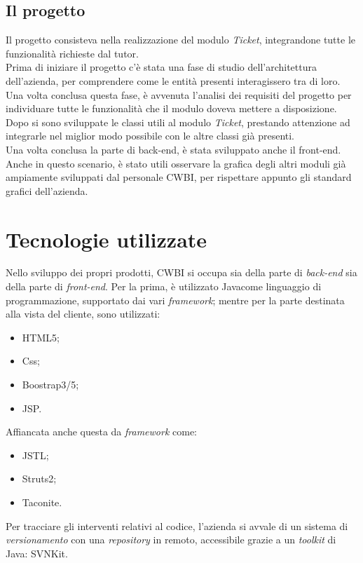 \subsection{Il progetto}
Il progetto consisteva nella realizzazione del modulo \textit{Ticket}, integrandone tutte le funzionalità richieste dal tutor. \\
Prima di iniziare il progetto c'è stata una fase di studio dell'architettura dell'azienda, per comprendere come le entità presenti interagissero tra di loro. Una volta conclusa questa fase, è avvenuta l'analisi dei requisiti del progetto per individuare tutte le funzionalità che il modulo doveva mettere a disposizione. Dopo si sono sviluppate le classi utili al modulo \textit{Ticket}, prestando attenzione ad integrarle nel miglior modo possibile con le altre classi già presenti. \\
Una volta conclusa la parte di back-end, è stata sviluppato anche il front-end. Anche in questo scenario, è stato utili osservare la grafica degli altri moduli già ampiamente sviluppati dal personale CWBI, per rispettare appunto gli standard grafici dell'azienda. 


\section{Tecnologie utilizzate}
Nello sviluppo dei propri prodotti, CWBI si occupa sia della parte di \textit{back-end\glsfirstoccur\;} sia della parte di \textit{front-end\glsfirstoccur\;}.
Per la prima, è utilizzato Java\glsfirstoccur come linguaggio di programmazione, supportato dai vari \textit{framework\glsfirstoccur}; mentre per la parte destinata alla vista del cliente, sono utilizzati:
\begin{itemize}
\item HTML5\glsfirstoccur ;
\item Css\glsfirstoccur ;
\item Boostrap3/5\glsfirstoccur ;
\item JSP\glsfirstoccur .
\end{itemize}
Affiancata anche questa da \textit{framework} come: 
\begin{itemize}
\item JSTL\glsfirstoccur ;
\item Struts2\glsfirstoccur ;
\item Taconite\glsfirstoccur .
\end{itemize}
Per tracciare gli interventi relativi al codice, l'azienda si avvale di un sistema di \textit{versionamento\glsfirstoccur}\; con una \textit{repository\glsfirstoccur}\; in remoto, accessibile grazie a un \textit{toolkit} di Java: SVNKit\glsfirstoccur.

